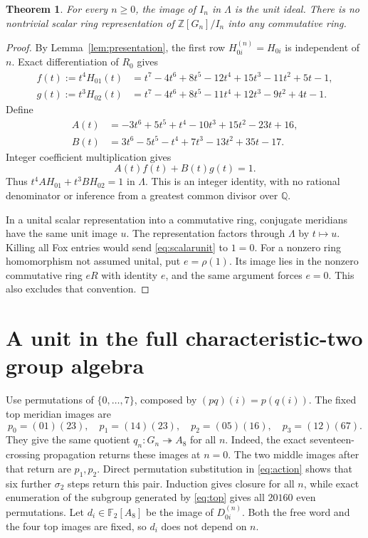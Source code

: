 \documentclass[11pt]{article}
\newtheorem{theorem}{Theorem}
\newcommand{\Z}{\mathbb Z}
\newcommand{\F}{\mathbb F}
\begin{document}
\begin{theorem}\label{thm:scalar}
For every $n\ge0$, the image of $I_n$ in $\Lambda$ is the unit ideal.
There is no nontrivial scalar ring representation of $\Z[G_n]/I_n$
into any commutative ring.
\end{theorem}
\begin{proof}
By Lemma~\ref{lem:presentation}, the first row $H_{0i}^{(n)}=H_{0i}$
is independent of $n$. Exact differentiation of $R_0$ gives
\begin{align*}
 f(t):=t^4H_{01}(t)&=t^7-4t^6+8t^5-12t^4+15t^3-11t^2+5t-1,\\
 g(t):=t^3H_{02}(t)&=t^7-4t^6+8t^5-11t^4+12t^3-9t^2+4t-1.
\end{align*}
Define
\begin{align*}
 A(t)&=-3t^6+5t^5+t^4-10t^3+15t^2-23t+16,\\
 B(t)&=3t^6-5t^5-t^4+7t^3-13t^2+35t-17.
\end{align*}
Integer coefficient multiplication gives
\begin{equation}\label{eq:scalarunit}
                  A(t)f(t)+B(t)g(t)=1.
\end{equation}
Thus $t^4AH_{01}+t^3BH_{02}=1$ in $\Lambda$.
This is an integer identity, with no rational denominator or inference
from a greatest common divisor over $\mathbb Q$.

In a unital scalar representation into a commutative ring, conjugate
meridians have the same unit image $u$. The representation factors
through $\Lambda$ by $t\mapsto u$. Killing all Fox entries would send
\eqref{eq:scalarunit} to $1=0$. For a nonzero ring homomorphism not
assumed unital, put $e=\rho(1)$. Its image lies in the nonzero
commutative ring $eR$ with identity $e$, and the same argument forces
$e=0$. This also excludes that convention.
\end{proof}

\section{A unit in the full characteristic-two group algebra}
Use permutations of $\{0,\ldots,7\}$, composed by
$(pq)(i)=p(q(i))$. The fixed top meridian images are
\begin{equation}\label{eq:top}
 p_0=(01)(23),\quad p_1=(14)(23),\quad
 p_2=(05)(16),\quad p_3=(12)(67).
\end{equation}
They give the same quotient $q_n:G_n\twoheadrightarrow A_8$ for all $n$.
Indeed, the exact seventeen-crossing propagation returns these images
at $n=0$. The two middle images after that return are $p_1,p_2$.
Direct permutation substitution in \eqref{eq:action} shows that six
further $\sigma_2$ steps return this pair. Induction gives closure
for all $n$, while exact enumeration of the subgroup generated by
\eqref{eq:top} gives all $20160$ even permutations.
Let $d_i\in\F_2[A_8]$ be the image of $D_{0i}^{(n)}$.
Both the free word and the four top images are fixed, so $d_i$ does
not depend on $n$.
\end{document}
